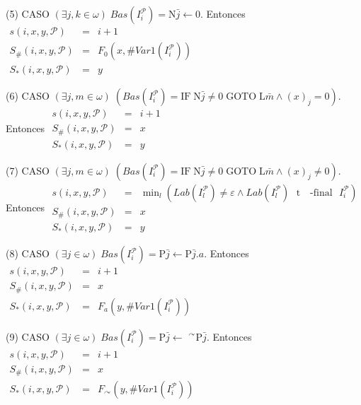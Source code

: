 (5) CASO \((\exists j,k\in \omega )\;Bas(I_{i}^{\mathcal{P}})=\mathrm{N }\bar{j}\leftarrow 0\). Entonces
\(\displaystyle \begin{array}{rcl} s(i,x,y,\mathcal{P}) & =& i+1 \\ S_{\#}(i,x,y,\mathcal{P}) & =& F_{0}(x,\#Var1(I_{i}^{\mathcal{P}})) \\ S_{\ast }(i,x,y,\mathcal{P}) & =& y \end{array} \)

(6) CASO \((\exists j,m\in \omega )\;\left( Bas(I_{i}^{\mathcal{P}})= \mathrm{IF}\;\mathrm{N}\bar{j}\neq 0\;\mathrm{GOTO}\;\mathrm{L}\bar{m}\wedge (x)_{j}=0\right) \). Entonces
\(\displaystyle \begin{array}{rcl} s(i,x,y,\mathcal{P}) & =& i+1 \\ S_{\#}(i,x,y,\mathcal{P}) & =& x \\ S_{\ast }(i,x,y,\mathcal{P}) & =& y \end{array} \)

(7) CASO \((\exists j,m\in \omega )\;\left( Bas(I_{i}^{\mathcal{P}})= \mathrm{IF}\;\mathrm{N}\bar{j}\neq 0\;\mathrm{GOTO}\;\mathrm{L}\bar{m}\wedge (x)_{j}\neq 0\right) \). Entonces
\(\displaystyle \begin{array}{rcl} s(i,x,y,\mathcal{P}) & =& \min_{l}\left( Lab(I_{l}^{\mathcal{P}})\neq \varepsilon \wedge Lab(I_{l}^{\mathcal{P}})\text{ }\mathrm{t}\text{ { -final} }I_{i}^{\mathcal{P}}\right) \\ S_{\#}(i,x,y,\mathcal{P}) & =& x \\ S_{\ast }(i,x,y,\mathcal{P}) & =& y \end{array} \)

(8) CASO \((\exists j\in \omega )\;Bas(I_{i}^{\mathcal{P}})=\mathrm{P} \bar{j}\leftarrow \mathrm{P}\bar{j}.a\). Entonces
\(\displaystyle \begin{array}{rcl} s(i,x,y,\mathcal{P}) & =& i+1 \\ S_{\#}(i,x,y,\mathcal{P}) & =& x \\ S_{\ast }(i,x,y,\mathcal{P}) & =& F_{a}(y,\#Var1(I_{i}^{\mathcal{P}})) \end{array} \)

(9) CASO \((\exists j\in \omega )\;Bas(I_{i}^{\mathcal{P}})=\mathrm{P} \bar{j}\leftarrow \) \(^{\curvearrowright }\mathrm{P}\bar{j}\). Entonces
\(\displaystyle \begin{array}{rcl} s(i,x,y,\mathcal{P}) & =& i+1 \\ S_{\#}(i,x,y,\mathcal{P}) & =& x \\ S_{\ast }(i,x,y,\mathcal{P}) & =& F_{\curvearrowright }(y,\#Var1(I_{i}^{ \mathcal{P}})) \end{array} \)

